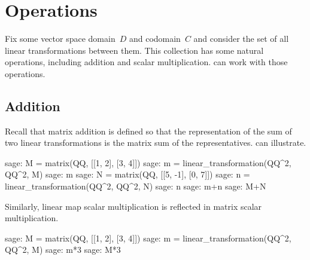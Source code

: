 \section{Operations}

Fix some vector space domain~$D$ and codomain~$C$ and consider the
set of all linear transformations between them. 
This collection has some natural operations, including
addition and scalar multiplication.
\Sage{} can work with those operations.

\subsection{Addition}
Recall that matrix addition is defined so that the representation of
the sum of two linear transformations is the matrix sum of the representatives.
\Sage{} can illustrate.
\begin{sagecommandline}
sage: M = matrix(QQ, [[1, 2], [3, 4]])
sage: m = linear_transformation(QQ^2, QQ^2, M)
sage: m
sage: N = matrix(QQ, [[5, -1], [0, 7]])
sage: n = linear_transformation(QQ^2, QQ^2, N)
sage: n
sage: m+n
sage: M+N
\end{sagecommandline}
\noindent Similarly, linear map scalar multiplication is reflected in 
matrix scalar multiplication.
\begin{sagecommandline}
sage: M = matrix(QQ, [[1, 2], [3, 4]])
sage: m = linear_transformation(QQ^2, QQ^2, M)
sage: m*3
sage: M*3  
\end{sagecommandline}



